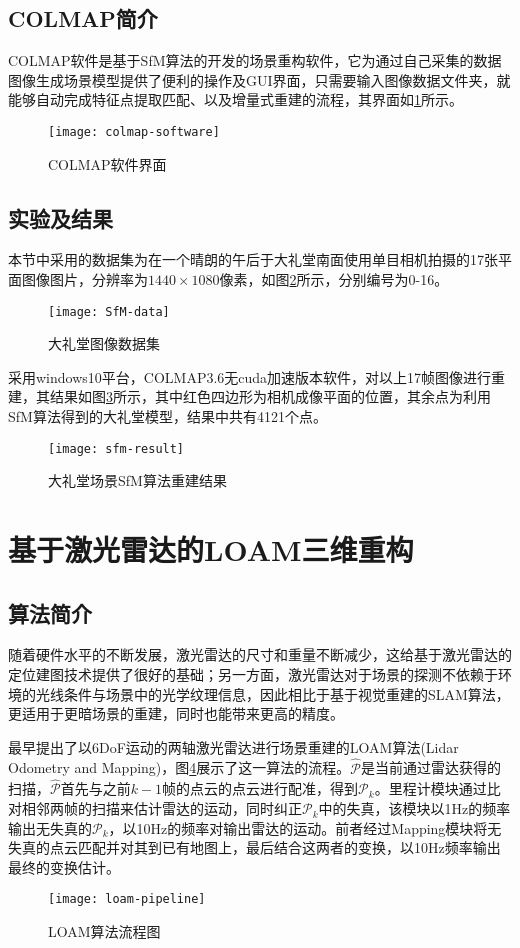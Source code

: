 \subsection{COLMAP简介}
COLMAP软件是基于SfM算法的开发的场景重构软件，它为通过自己采集的数据图像生成场景模型提供了便利的操作及GUI界面，只需要输入图像数据文件夹，就能够自动完成特征点提取匹配、以及增量式重建的流程，其界面如\ref{colmap-software}所示。
\begin{figure}
	\centering
	\texttt{[image: colmap-software]}
	\caption{COLMAP软件界面}
	\label{colmap-software}
\end{figure}

\subsection{实验及结果}
本节中采用的数据集为在一个晴朗的午后于大礼堂南面使用单目相机拍摄的17张平面图像图片，分辨率为$1440\times 1080$像素，如图\ref{sfm-data}所示，分别编号为0-16。
\begin{figure}
	\centering
	\texttt{[image: SfM-data]}
	\caption{大礼堂图像数据集}
	\label{sfm-data}
\end{figure}

采用windows10平台，COLMAP3.6无cuda加速版本软件，对以上17帧图像进行重建，其结果如图\ref{sfm-result}所示，其中红色四边形为相机成像平面的位置，其余点为利用SfM算法得到的大礼堂模型，结果中共有4121个点。
\begin{figure}
	\centering
	\texttt{[image: sfm-result]}
	\caption{大礼堂场景SfM算法重建结果}
	\label{sfm-result}
\end{figure}

\section{基于激光雷达的LOAM三维重构}
\subsection{算法简介}
随着硬件水平的不断发展，激光雷达的尺寸和重量不断减少，这给基于激光雷达的定位建图技术提供了很好的基础；另一方面，激光雷达对于场景的探测不依赖于环境的光线条件与场景中的光学纹理信息，因此相比于基于视觉重建的SLAM算法，更适用于更暗场景的重建，同时也能带来更高的精度。

\citet{zhang2014loam}最早提出了以6DoF运动的两轴激光雷达进行场景重建的LOAM算法(Lidar Odometry and Mapping)，图\ref{loam-pipeline}展示了这一算法的流程。$\hat{\mathcal{P}}$是当前通过雷达获得的扫描，$\hat{\mathcal{P}}$首先与之前$k-1$帧的点云的点云进行配准，得到$\mathcal{P}_k$。里程计模块通过比对相邻两帧的扫描来估计雷达的运动，同时纠正$\mathcal{P}_k$中的失真，该模块以1Hz的频率输出无失真的$\mathcal{P}_k$，以10Hz的频率对输出雷达的运动。前者经过Mapping模块将无失真的点云匹配并对其到已有地图上，最后结合这两者的变换，以10Hz频率输出最终的变换估计。
\begin{figure}
	\centering
	\texttt{[image: loam-pipeline]}
	\caption{LOAM算法流程图}
	\label{loam-pipeline}
\end{figure}


